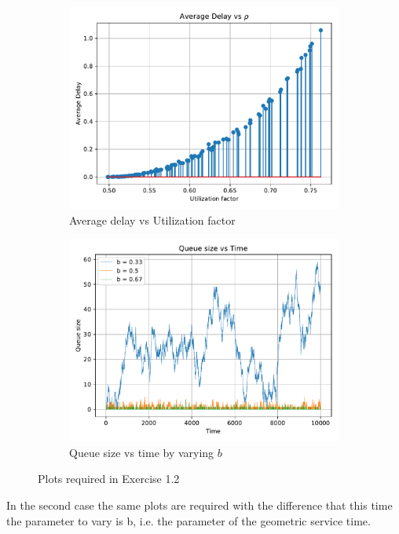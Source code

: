 \documentclass[11pt,a4paper]{article}
\begin{document}
\begin{figure}[ht]
\centering
\begin{subfigure}{.5\textwidth}
  \centering
  \includegraphics[width=\linewidth]{avg_delay_vs_rho_2}
  \caption{Average delay vs Utilization factor}
  \label{fig:delayRho2}
\end{subfigure}%
\begin{subfigure}{.5\textwidth}
  \centering
  \includegraphics[width=\linewidth]{queue_size_vs_time_logy_es2}
  \caption{Queue size vs time by varying $b$}
  \label{fig:queueSize2}
\end{subfigure}
\caption{Plots required in Exercise 1.2}
\end{figure}
In the second case the same plots are required with the difference that this time the parameter to vary is b, i.e. the parameter of the geometric service time.
\end{document}
